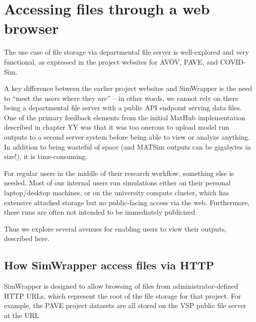 \hypertarget{accessing-files-through-a-web-browser}{%
\section{Accessing files through a web
browser}\label{accessing-files-through-a-web-browser}}

The use case of file storage via departmental file server is
well-explored and very functional, as expressed in the project websites
for AVÖV, PAVE, and COVID-Sim.

A key difference between the earlier project websites and SimWrapper is
the need to ``meet the users where they are'' -- in other words, we
cannot rely on there being a departmental file server with a public API
endpoint serving data files. One of the primary feedback elements from
the initial MatHub implementation described in chapter YY was that it
was too onerous to upload model run outputs to a second server system
before being able to view or analyze anything. In addition to being
wasteful of space (and MATSim outputs can be gigabytes in size!), it is
time-consuming.

For regular users in the middle of their research workflow, something
else is needed. Most of our internal users run simulations either on
their personal laptop/desktop machines, or on the university compute
cluster, which has extensive attached storage but no public-facing
access via the web. Furthermore, these runs are often not intended to be
immediately publicized.

Thus we explore several avenues for enabling users to view their
outputs, described here.


\hypertarget{how-simwrapper-access-files-via-http}{%
\subsection{How SimWrapper access files via
HTTP}\label{how-simwrapper-access-files-via-http}}

SimWrapper is designed to allow browsing of files from
administrator-defined HTTP URLs, which represent the root of the file
storage for that project. For example, the PAVE project datasets are all
stored on the VSP public file server at the URL

